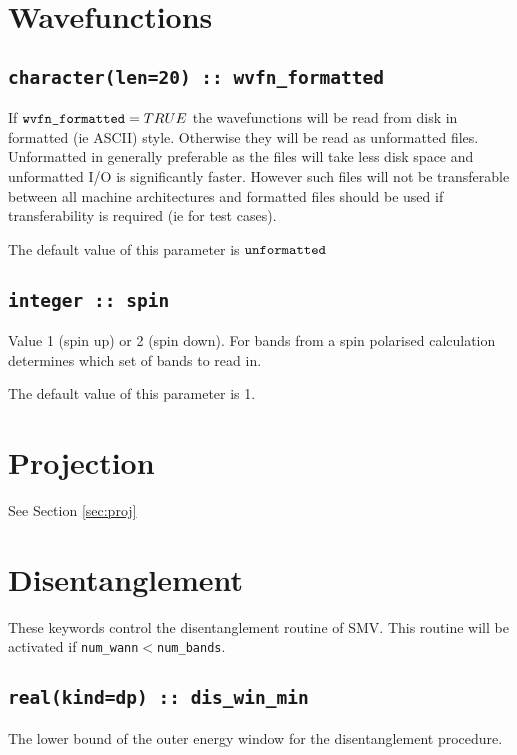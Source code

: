 \section{Wavefunctions}



\subsection[wvfn\_formated]{\tt character(len=20) :: wvfn\_formatted}

If $\verb#wvfn_formatted#=TRUE$ the wavefunctions will be read from disk
in formatted (ie ASCII) style. Otherwise they will be read as unformatted
files. Unformatted in generally preferable as the files will take less disk
space and unformatted I/O is significantly faster. However such files
will not be transferable between all machine architectures and formatted
files should be used if transferability is required (ie for test cases).

The default value of this parameter is $\verb#unformatted#$


\subsection[spin]{\tt integer :: spin}
 Value 1 (spin up) or 2 (spin
down). For bands from a spin polarised calculation determines which set
of bands to read in.

The default value of this parameter is 1.





\section{Projection}

See Section \ref{sec:proj}



\section{Disentanglement}
These keywords control the disentanglement routine of SMV. This routine
will be activated if \verb#num_wann#$<$\verb#num_bands#.


\subsection[dis\_win\_min]{\tt real(kind=dp) :: dis\_win\_min}
The lower bound of the outer energy window for the disentanglement
procedure.


